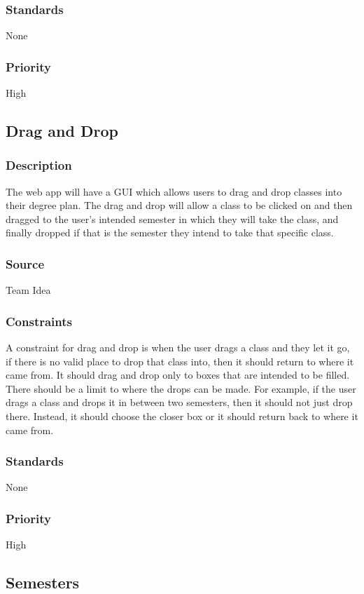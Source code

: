\subsubsection{Standards}
None
\subsubsection{Priority}
High

\subsection{Drag and Drop}
\subsubsection{Description}
The web app will have a GUI which allows users to drag and drop classes into their degree plan. The drag and drop will allow a class to be clicked on and then dragged to the user's intended semester in which they will take the class, and finally dropped if that is the semester they intend to take that specific class.
\subsubsection{Source}
Team Idea
\subsubsection{Constraints}
A constraint for drag and drop is when the user drags a class and they let it go, if there is no valid place to drop that class into, then it should return to where it came from. It should drag and drop only to boxes that are intended to be filled. There should be a limit to where the drops can be made. For example, if the user drags a class and drops it in between two semesters, then it should not just drop there. Instead, it should choose the closer box or it should return back to where it came from. 
\subsubsection{Standards}
None
\subsubsection{Priority}
High

\subsection{Semesters}

